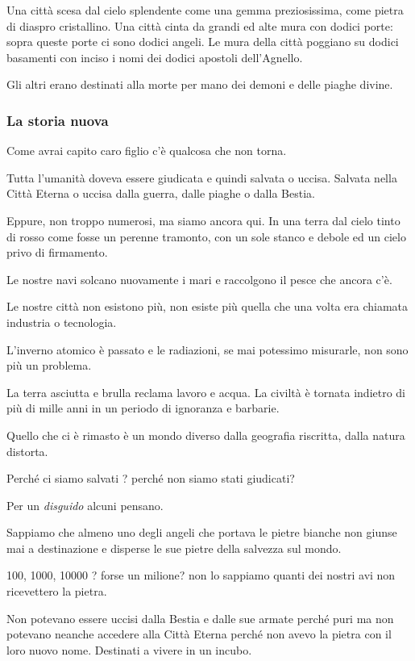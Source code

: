 \documentclass[12pt,a4paper,twoside,openany]{book}
\begin{document}
\begin{multicols}{2}
Una città scesa dal cielo splendente come una gemma preziosissima, come pietra di diaspro cristallino. Una città cinta da grandi ed alte mura con dodici porte: sopra queste porte ci sono dodici angeli.
Le mura della città poggiano su dodici basamenti con inciso i nomi dei dodici apostoli dell’Agnello.

Gli altri erano destinati alla morte per mano dei demoni e delle piaghe divine.

\subsubsection{La storia nuova}

Come avrai capito caro figlio c'è qualcosa che non torna.

Tutta l'umanità doveva essere giudicata e quindi salvata o uccisa. Salvata nella Città Eterna o uccisa dalla guerra, dalle piaghe o dalla Bestia.

Eppure, non troppo numerosi, ma siamo ancora qui. In una terra dal cielo tinto di rosso come fosse un perenne tramonto, con un sole stanco e debole ed un cielo privo di firmamento.

Le nostre navi solcano nuovamente i mari e raccolgono il pesce che ancora c'è.

Le nostre città non esistono più, non esiste più quella che una volta era chiamata industria o tecnologia.

L'inverno atomico è passato e le radiazioni, se mai potessimo misurarle, non sono più un problema.

La terra asciutta e brulla reclama lavoro e acqua. La civiltà è tornata indietro di più di mille anni in un periodo di ignoranza e barbarie.

Quello che ci è rimasto è un mondo diverso dalla geografia riscritta, dalla natura distorta.

Perché ci siamo salvati ? perché non siamo stati giudicati?

Per un \textit{disguido} alcuni pensano.

Sappiamo che almeno uno degli angeli che portava le pietre bianche non giunse mai a destinazione e disperse le sue pietre della salvezza sul mondo.

100, 1000, 10000 ? forse un milione?  non lo sappiamo quanti dei nostri avi non ricevettero la pietra.

Non potevano essere uccisi dalla Bestia e dalle sue armate perché puri ma non potevano neanche accedere alla Città Eterna perché non avevo la pietra con il loro nuovo nome. Destinati a vivere in un incubo.


\end{multicols}
\end{document}
